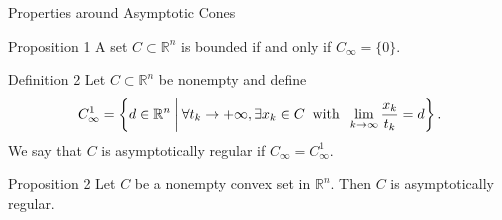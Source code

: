 \documentclass[aspectratio=169, dvipdfmx, 11pt]{beamer} %
\newcommand{\NDemenstionalRealEuclidianSpace}{\mathbb{R}^n}
\begin{document}
\begin{frame}{Properties around Asymptotic Cones}
  \begin{block}{Proposition 1}
    A set $C \subset \mathbb{R}^n$ is bounded if and only if $C_\infty = \{0\}$.
  \end{block}

  \begin{block}{Definition 2}
    Let $C \subset \NDemenstionalRealEuclidianSpace$ be nonempty and define
    \begin{equation}
      C_{\infty}^1 = \left\{d \in \NDemenstionalRealEuclidianSpace \:\middle|\: \forall t_k \rightarrow + \infty , \exists x_k \in C \:\text{ with }\: \lim_{k \to \infty} \frac{x_k}{t_k} = d \right\}. \notag
    \end{equation}
    We say that $C$ is asymptotically regular if $C_{\infty} = C_{\infty}^1$.
  \end{block}

  \begin{block}{Proposition 2}
    Let $C$ be a nonempty convex set in $\NDemenstionalRealEuclidianSpace$. Then $C$ is asymptotically regular.
  \end{block}
\end{frame}
\end{document}
